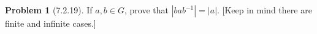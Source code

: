 \documentclass[12pt]{article}
\theoremstyle{definition}
\newtheorem*{prob}{Problem}
\newtheorem*{soln}{Solution}
\begin{document}
%
%

\begin{prob}[7.2.19]
If $a, b\in G$, prove that $|bab^{-1}| = |a|$. [Keep in mind there
are finite and infinite cases.]
\end{prob}
\end{document}
